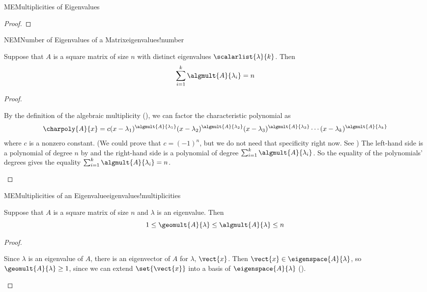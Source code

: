 \begin{subsect}{ME}{Multiplicities of Eigenvalues}
\begin{proof}
%
\end{proof}
%
\begin{theorem}{NEM}{Number of Eigenvalues of a Matrix}{eigenvalues!number}
\begin{para}Suppose that $A$ is a square matrix of size $n$ with distinct eigenvalues $\scalarlist{\lambda}{k}$.  Then
%
\begin{equation*}
\sum_{i=1}^{k}\algmult{A}{\lambda_i}=n
\end{equation*}
\end{para}
%
\end{theorem}
%
\begin{proof}
\begin{para}By the definition of the algebraic multiplicity (), we can factor the characteristic polynomial as
%
\begin{equation*}
\charpoly{A}{x}=c(x-\lambda_1)^{\algmult{A}{\lambda_1}}(x-\lambda_2)^{\algmult{A}{\lambda_2}}(x-\lambda_3)^{\algmult{A}{\lambda_3}}\cdots(x-\lambda_k)^{\algmult{A}{\lambda_k}}
\end{equation*}
%
where $c$ is a nonzero constant.  (We could prove that $c=(-1)^{n}$, but we do not need that specificity right now.  See )  The left-hand side is a polynomial of degree $n$ by  and the right-hand side is a polynomial of degree $\sum_{i=1}^{k}\algmult{A}{\lambda_i}$.  So the equality of the polynomials' degrees gives the equality $\sum_{i=1}^{k}\algmult{A}{\lambda_i}=n$.\end{para}
\end{proof}
%
\begin{theorem}{ME}{Multiplicities of an Eigenvalue}{eigenvalues!multiplicities}
\begin{para}Suppose that $A$ is a square matrix of size $n$ and $\lambda$ is an eigenvalue.  Then
%
\begin{equation*}
1\leq\geomult{A}{\lambda}\leq\algmult{A}{\lambda}\leq n
\end{equation*}
\end{para}
%
\end{theorem}
%
\begin{proof}
\begin{para}Since $\lambda$ is an eigenvalue of $A$, there is an eigenvector of $A$ for $\lambda$, $\vect{x}$.  Then $\vect{x}\in\eigenspace{A}{\lambda}$, so $\geomult{A}{\lambda}\geq 1$, since we can extend $\set{\vect{x}}$ into a basis of $\eigenspace{A}{\lambda}$ ().\end{para}

\end{proof}
\end{subsect}

